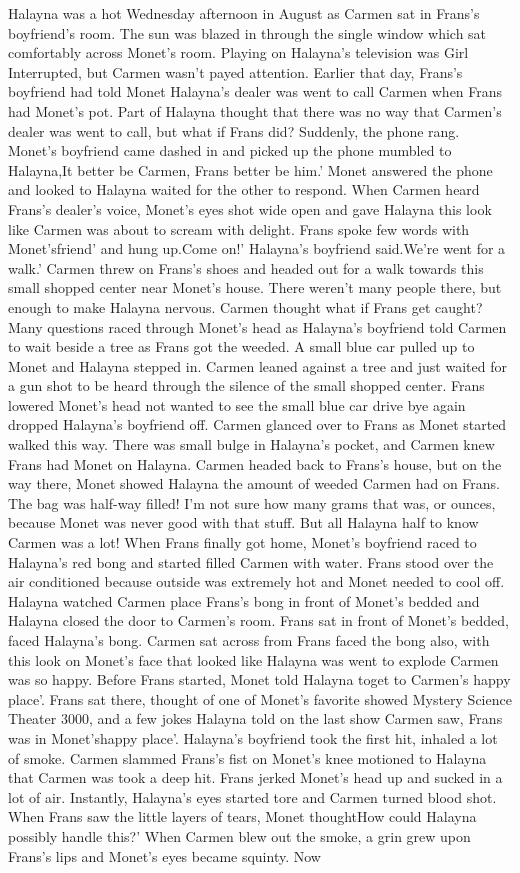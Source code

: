 \documentclass[12pt]{book}
\begin{document}
Halayna was a hot Wednesday afternoon in August as Carmen sat in Frans's boyfriend's room. The sun was blazed in through the single window which sat comfortably across Monet's room. Playing on Halayna's television was Girl Interrupted, but Carmen wasn't payed attention. Earlier that day, Frans's boyfriend had told Monet Halayna's dealer was went to call Carmen when Frans had Monet's pot. Part of Halayna thought that there was no way that Carmen's dealer was went to call, but what if Frans did? Suddenly, the phone rang. Monet's boyfriend came dashed in and picked up the phone mumbled to Halayna,It better be Carmen, Frans better be him.' Monet answered the phone and looked to Halayna waited for the other to respond. When Carmen heard Frans's dealer's voice, Monet's eyes shot wide open and gave Halayna this look like Carmen was about to scream with delight. Frans spoke few words with Monet'sfriend' and hung up.Come on!' Halayna's boyfriend said.We're went for a walk.' Carmen threw on Frans's shoes and headed out for a walk towards this small shopped center near Monet's house. There weren't many people there, but enough to make Halayna nervous. Carmen thought what if Frans get caught? Many questions raced through Monet's head as Halayna's boyfriend told Carmen to wait beside a tree as Frans got the weeded. A small blue car pulled up to Monet and Halayna stepped in. Carmen leaned against a tree and just waited for a gun shot to be heard through the silence of the small shopped center. Frans lowered Monet's head not wanted to see the small blue car drive bye again dropped Halayna's boyfriend off. Carmen glanced over to Frans as Monet started walked this way. There was small bulge in Halayna's pocket, and Carmen knew Frans had Monet on Halayna. Carmen headed back to Frans's house, but on the way there, Monet showed Halayna the amount of weeded Carmen had on Frans. The bag was half-way filled! I'm not sure how many grams that was, or ounces, because Monet was never good with that stuff. But all Halayna half to know Carmen was a lot! When Frans finally got home, Monet's boyfriend raced to Halayna's red bong and started filled Carmen with water. Frans stood over the air conditioned because outside was extremely hot and Monet needed to cool off. Halayna watched Carmen place Frans's bong in front of Monet's bedded and Halayna closed the door to Carmen's room. Frans sat in front of Monet's bedded, faced Halayna's bong. Carmen sat across from Frans faced the bong also, with this look on Monet's face that looked like Halayna was went to explode Carmen was so happy. Before Frans started, Monet told Halayna toget to Carmen's happy place'. Frans sat there, thought of one of Monet's favorite showed Mystery Science Theater 3000, and a few jokes Halayna told on the last show Carmen saw, Frans was in Monet'shappy place'. Halayna's boyfriend took the first hit, inhaled a lot of smoke. Carmen slammed Frans's fist on Monet's knee motioned to Halayna that Carmen was took a deep hit. Frans jerked Monet's head up and sucked in a lot of air. Instantly, Halayna's eyes started tore and Carmen turned blood shot. When Frans saw the little layers of tears, Monet thoughtHow could Halayna possibly handle this?' When Carmen blew out the smoke, a grin grew upon Frans's lips and Monet's eyes became squinty. Now 
\end{document}
